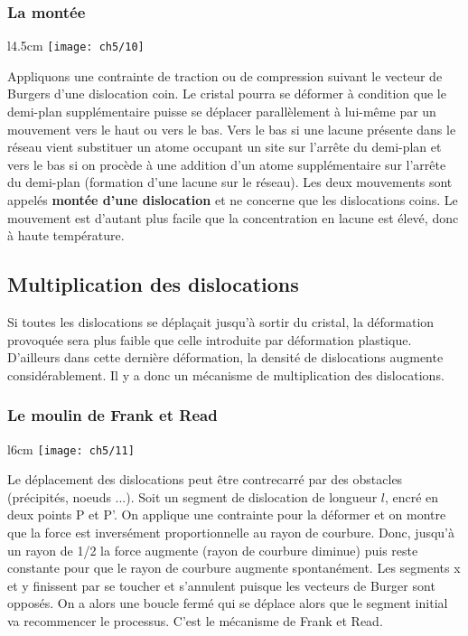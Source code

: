 	\subsubsection{La montée}
		\begin{wrapfigure}[6]{l}{4.5cm}
		\vspace{-5mm}
		\texttt{[image: ch5/10]}
		\end{wrapfigure}
		Appliquons une contrainte de traction ou de compression suivant le vecteur de Burgers d'une dislocation coin. Le cristal pourra se déformer à condition que le demi-plan supplémentaire puisse se déplacer parallèlement à lui-même par un mouvement vers le haut ou vers le bas. Vers le bas si une lacune présente dans le réseau vient substituer un atome occupant un site sur l'arrête du demi-plan et vers le bas si on procède à une addition d'un atome supplémentaire sur l'arrête du demi-plan (formation d'une lacune sur le réseau). Les deux mouvements sont appelés \textbf{montée d'une dislocation} et ne concerne que les dislocations coins. Le mouvement est d'autant plus facile que la concentration en lacune est élevé, donc à haute température.  
			
	\subsection{Multiplication des dislocations}
		Si toutes les dislocations se déplaçait jusqu'à sortir du cristal, la déformation provoquée sera plus faible que celle introduite par déformation plastique. D'ailleurs dans cette dernière déformation, la densité de dislocations augmente considérablement. Il y a donc un mécanisme de multiplication des dislocations. 
		
		\subsubsection{Le moulin de Frank et Read}
			\begin{wrapfigure}[8]{l}{6cm}
		\vspace{-5mm}
		\texttt{[image: ch5/11]}
		\end{wrapfigure}
			Le déplacement des dislocations peut être contrecarré par des obstacles (précipités, noeuds ...). Soit un segment de dislocation de longueur $l$, encré en deux points P et P'. On applique une contrainte pour la déformer et on montre que la force est inversément proportionnelle au rayon de courbure. Donc, jusqu'à un rayon de 1/2 la force augmente (rayon de courbure diminue) puis reste constante pour que le rayon de courbure augmente spontanément. Les segments x et y finissent par se toucher et s'annulent puisque les vecteurs de Burger sont opposés. On a alors une boucle fermé qui se déplace alors que le segment initial va recommencer le processus. C'est le mécanisme de Frank et Read. 
			
